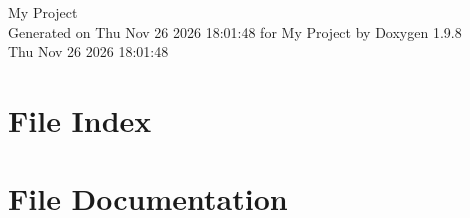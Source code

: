 \documentclass[twoside]{book}
\newcommand{\+}{\discretionary{\mbox{\scriptsize$\hookleftarrow$}}{}{}}
\newcommand{\clearemptydoublepage}{%
    \newpage{\pagestyle{empty}\cleardoublepage}%
  }
\begin{document}
  \raggedbottom
    \hypersetup{pageanchor=false,
                bookmarksnumbered=true,
                pdfencoding=unicode
               }
  \begin{titlepage}
  \vspace*{7cm}
  \begin{center}%
  {\Large My Project}\\
  \vspace*{1cm}
  {\large Generated on Thu Nov 26 2026 18\+:01\+:48 for My Project by Doxygen 1.9.8}\\
    \vspace*{0.5cm}
    {\small Thu Nov 26 2026 18:01:48}
  \end{center}
  \end{titlepage}
  \clearemptydoublepage
  \tableofcontents
  \clearemptydoublepage
  \hypersetup{pageanchor=true}

\chapter{File Index}

\chapter{File Documentation}


  \backmatter
  \newpage
  \clearemptydoublepage
  \printindex
\end{document}
